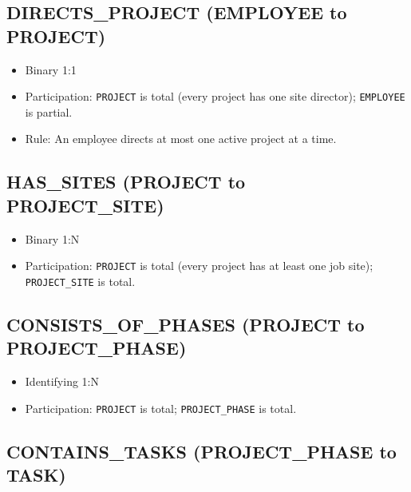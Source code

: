 \documentclass[a4paper,12pt]{report}
\providecommand{\tightlist}{%
  \setlength{\itemsep}{0pt}\setlength{\parskip}{0pt}}
\begin{document}
\subsection{\texorpdfstring{DIRECTS\texorpdfstring{\_\allowbreak{}}{_}PROJECT (EMPLOYEE to PROJECT)}{DIRECTSPROJECT (EMPLOYEE to PROJECT)}}\label{directs_project-employee-to-project}

\begin{itemize}
\tightlist
\item
  Binary 1:1
\item
  Participation: \texttt{PROJECT} is total (\allowbreak{}every project has one site director); \texttt{EMPLOYEE} is partial.
\item
  Rule: An employee directs at most one active project at a time.
\end{itemize}

\subsection{\texorpdfstring{HAS\texorpdfstring{\_\allowbreak{}}{_}SITES (PROJECT to PROJECT\texorpdfstring{\_\allowbreak{}}{_}SITE)}{HASSITES (PROJECT to PROJECTSITE)}}\label{has_sites-project-to-project_site}

\begin{itemize}
\tightlist
\item
  Binary 1:N
\item
  Participation: \texttt{PROJECT} is total (\allowbreak{}every project has at least one job site); \texttt{PROJECT\_\allowbreak{}SITE} is total.
\end{itemize}

\subsection{\texorpdfstring{CONSISTS\texorpdfstring{\_\allowbreak{}}{_}OF\texorpdfstring{\_\allowbreak{}}{_}PHASES (PROJECT to PROJECT\texorpdfstring{\_\allowbreak{}}{_}PHASE)}{CONSISTSOFPHASES (PROJECT to PROJECTPHASE)}}\label{consists_of_phases-project-to-project_phase}

\begin{itemize}
\tightlist
\item
  Identifying 1:N
\item
  Participation: \texttt{PROJECT} is total; \texttt{PROJECT\_\allowbreak{}PHASE} is total.
\end{itemize}

\subsection{\texorpdfstring{CONTAINS\texorpdfstring{\_\allowbreak{}}{_}TASKS (PROJECT\texorpdfstring{\_\allowbreak{}}{_}PHASE to TASK)}{CONTAINSTASKS (PROJECTPHASE to TASK)}}\label{contains_tasks-project_phase-to-task}
\end{document}
